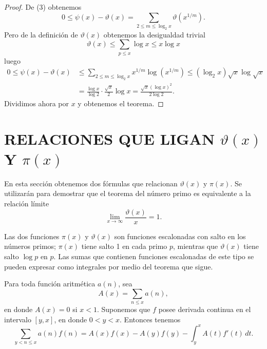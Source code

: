 \documentclass[12pt,a4paper]{book}
\begin{document}
    \begin{proof}
        De (3) obtenemos
        \begin{equation*}
            0\leq\psi(x)-\vartheta(x)=\sum_{2\leq m\leq\log_2x}\vartheta(x^{1/m}).
        \end{equation*}
        Pero de la definición de $\vartheta(x)$ obtenemos la desigualdad trivial
        \begin{equation*}
            \vartheta(x)\leq\sum_{p\leq x}\log x\leq x\log x
        \end{equation*}
        luego
        \begin{align*}
            0\leq\psi(x)-\vartheta(x)&\leq\sum_{2\leq m\leq\log_2x}x^{1/m}\log(x^{1/m})
            \leq(\log_2x)\sqrt{x}\log\sqrt{x}\\
            &=\frac{\log x}{\log2}\cdot\frac{\sqrt{x}}{2}\log x=\frac{\sqrt{x}(\log x)^2}{2\log2}.
        \end{align*}
        Dividimos ahora por $x$ y obtenemos el teorema.
    \end{proof}

    \section{RELACIONES QUE LIGAN \texorpdfstring{$\vartheta(x)$}{ϑ(x)} Y \texorpdfstring{$\pi(x)$}{π(x)}}

    En esta sección obtenemos dos fórmulas que relacionan $\vartheta(x)$ y $\pi(x)$. Se
    utilizarán para demostrar que el teorema del número primo es equivalente a la
    relación límite
    \begin{equation*}
        \lim_{x\to\infty}\frac{\vartheta(x)}{x}=1.
    \end{equation*}

    Las dos funciones $\pi(x)$ y $\vartheta(x)$ son funciones escalonadas con salto en
    los números primos; $\pi(x)$ tiene salto 1 en cada primo $p$, mientras que
    $\vartheta(x)$ tiene salto $\log p$ en $p$. Las sumas que contienen funciones
    escalonadas de este tipo se pueden expresar como integrales por medio del teorema
    que sigue.

    \begin{teorema}
        Para toda función aritmética $a(n)$, sea
        \begin{equation*}
            A(x)=\sum_{n\leq x}a(n),
        \end{equation*}
        en donde $A(x)=0$ si $x<1$. Suponemos que $f$ posee derivada continua en el
        intervalo $[y,x]$, en donde $0<y<x$. Entonces tenemos
        \begin{equation}
            \sum_{y<n\leq x}a(n)f(n)=A(x)f(x)-A(y)f(y)-\int_y^x A(t)f'(t)\,dt.
        \end{equation}
    \end{teorema}
\end{document}
